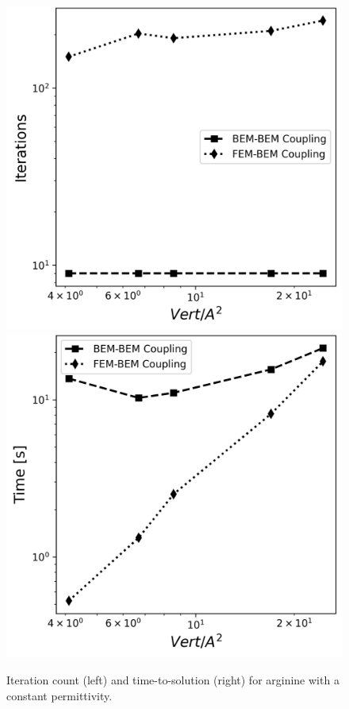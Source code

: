 \begin{figure}
\centering
   \includegraphics[width=0.45\linewidth]{DolfinX_Arginine2_const_coeff_iter.png}
  \includegraphics[width=0.45\linewidth]{DolfinX_Arginine2_const_coeff_total_time.png}
  \caption{Iteration count (left) and time-to-solution (right) for arginine with a constant permittivity. %
}
\label{fig:arg2_constant_time_iter}
\end{figure}

